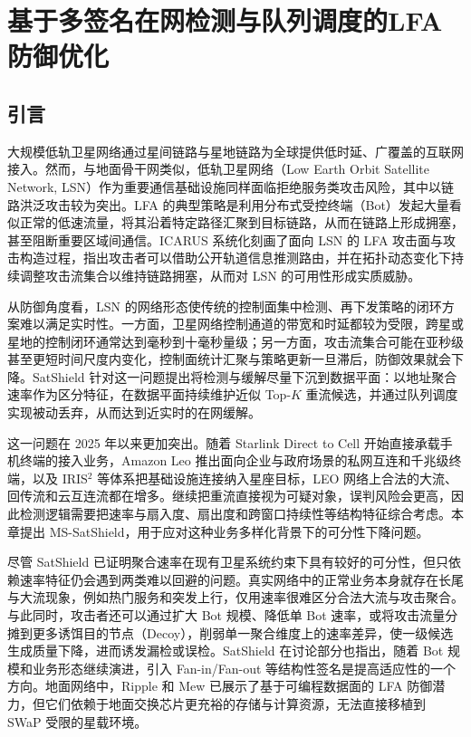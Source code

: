 \chapter{基于多签名在网检测与队列调度的LFA防御优化}
\label{chap:ms_satshield}

\section{引言}
大规模低轨卫星网络通过星间链路与星地链路为全球提供低时延、广覆盖的互联网接入。然而，与地面骨干网类似，低轨卫星网络（Low Earth Orbit Satellite Network, LSN）作为重要通信基础设施同样面临拒绝服务类攻击风险，其中以链路洪泛攻击较为突出。LFA 的典型策略是利用分布式受控终端（Bot）发起大量看似正常的低速流量，将其沿着特定路径汇聚到目标链路，从而在链路上形成拥塞，甚至阻断重要区域间通信。ICARUS 系统化刻画了面向 LSN 的 LFA 攻击面与攻击构造过程，指出攻击者可以借助公开轨道信息推测路由，并在拓扑动态变化下持续调整攻击流集合以维持链路拥塞，从而对 LSN 的可用性形成实质威胁。

从防御角度看，LSN 的网络形态使传统的控制面集中检测、再下发策略的闭环方案难以满足实时性。一方面，卫星网络控制通道的带宽和时延都较为受限，跨星或星地的控制闭环通常达到毫秒到十毫秒量级；另一方面，攻击流集合可能在亚秒级甚至更短时间尺度内变化，控制面统计汇聚与策略更新一旦滞后，防御效果就会下降。SatShield 针对这一问题提出将检测与缓解尽量下沉到数据平面：以地址聚合速率作为区分特征，在数据平面持续维护近似 Top-$K$ 重流候选，并通过队列调度实现被动丢弃，从而达到近实时的在网缓解。


这一问题在 2025 年以来更加突出。随着 Starlink Direct to Cell 开始直接承载手机终端的接入业务，Amazon Leo 推出面向企业与政府场景的私网互连和千兆级终端，以及 IRIS$^2$ 等体系把基础设施连接纳入星座目标，LEO 网络上合法的大流、回传流和云互连流都在增多。继续把重流直接视为可疑对象，误判风险会更高，因此检测逻辑需要把速率与扇入度、扇出度和跨窗口持续性等结构特征综合考虑。本章提出 MS-SatShield，用于应对这种业务多样化背景下的可分性下降问题。

尽管 SatShield 已证明聚合速率在现有卫星系统约束下具有较好的可分性，但只依赖速率特征仍会遇到两类难以回避的问题。真实网络中的正常业务本身就存在长尾与大流现象，例如热门服务和突发上行，仅用速率很难区分合法大流与攻击聚合。与此同时，攻击者还可以通过扩大 Bot 规模、降低单 Bot 速率，或将攻击流量分摊到更多诱饵目的节点（Decoy），削弱单一聚合维度上的速率差异，使一级候选生成质量下降，进而诱发漏检或误检。SatShield 在讨论部分也指出，随着 Bot 规模和业务形态继续演进，引入 Fan-in/Fan-out 等结构性签名是提高适应性的一个方向。地面网络中，Ripple 和 Mew 已展示了基于可编程数据面的 LFA 防御潜力，但它们依赖于地面交换芯片更充裕的存储与计算资源，无法直接移植到 SWaP 受限的星载环境。

